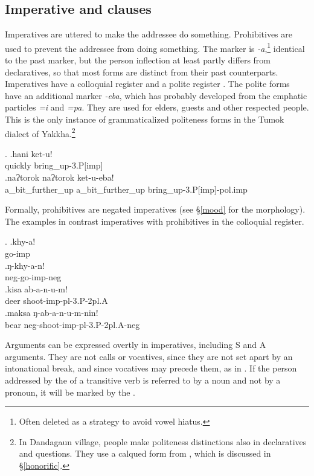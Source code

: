 \subsection{Imperative and  clauses}

Imperatives are uttered to make the addressee do something. Prohibitives are used to prevent the addressee from doing something. The  marker is \emph{-a},\footnote{Often deleted as a strategy to avoid vowel hiatus.} identical to the past marker, but the person inflection at least partly differs from declaratives, so that most forms are distinct from their past counterparts. Imperatives have a colloquial register \Next[a] and a polite register \Next[b]. The polite forms have an additional marker \emph{-eba}, which has probably developed from the emphatic particles \emph{=i} and \emph{=pa}. They are used for elders, guests and other respected people. This is the only instance of grammaticalized politeness forms in the Tumok dialect of Yakkha.\footnote{In Dandagaun village, people make politeness distinctions also in declaratives and questions. They use a calqued form from , which is discussed in §\ref{honorific}.} 

\ex. \ag.hani ket-u!\\
quickly bring\_up{\sc -3.P[imp]}\\
\bg.naʔtorok naʔtorok ket-u-eba!\\
a\_bit\_further\_up a\_bit\_further\_up  bring\_up{\sc -3.P[imp]-pol.imp}\\

Formally, prohibitives are  negated imperatives (see §\ref{mood} for the morphology). The examples in \Next contrast  imperatives with prohibitives in the colloquial register.

\ex. \ag.khy-a!\\
go{\sc -imp}\\
\bg.ŋ-khy-a-n!\\
{\sc neg-}go{\sc -imp-neg}\\
\bg.kisa ab-a-n-u-m!\\
deer shoot{\sc -imp-pl-3.P-2pl.A}\\
\bg.maksa ŋ-ab-a-n-u-m-nin!\\
bear {\sc neg-}shoot{\sc -imp-pl-3.P-2pl.A-neg}\\

Arguments can be expressed overtly in imperatives, including S and A arguments. They are not calls or vocatives, since they are not set apart by an intonational break, and since vocatives may precede them, as in \Next[a]. If the person addressed by the  of a transitive verb is referred to by a noun and not by a pronoun, it will be marked by the .

